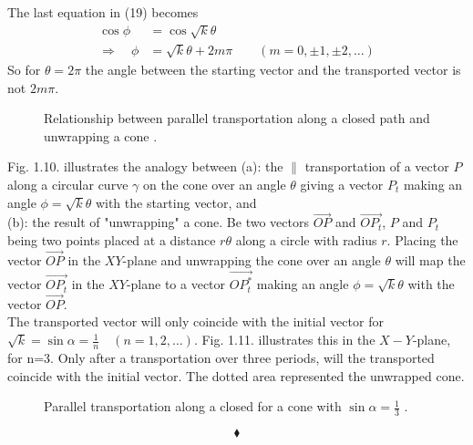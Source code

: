 The last equation in (19) becomes
\begin{align}
\cos{\phi} &= \cos{\sqrt{k}\theta} \\
\Rightarrow \quad \phi &= \sqrt{k}\theta + 2m\pi\quad\quad (m= 0,\pm 1,\pm 2, \dots)
\end{align}
So for $\theta = 2\pi$ the angle between the starting vector and the transported vector is not $2m\pi$. 
\begin{figure}[H]%
    \centering
    \subfloat[]{}
	\qquad
    \subfloat[]{}
\caption{Relationship between parallel transportation along a closed path and unwrapping a cone .}
\end{figure}
Fig. 1.10. illustrates the analogy between 
(a): the $\parallel$ transportation of a vector $P$ along a circular curve $\gamma$ on the cone over an angle $\theta$ giving a vector $P_t$ making an angle $\phi = \sqrt{k}\theta$ with the starting vector, and \\
(b): the result of "unwrapping" a cone. Be two vectors $\overrightarrow{OP}$ and $\overrightarrow{OP_t}$, $P$ and $P_t$ being two points placed at a distance $r\theta$ along a circle  with radius $r$. Placing the vector $\overrightarrow{OP}$ in the $XY$-plane and unwrapping the cone over an angle $\theta$ will map the vector $\overrightarrow{OP_t}$ in the $XY$-plane to a vector $\overrightarrow{OP_t^{*}}$ making an angle $\phi = \sqrt{k}\theta$ with the vector $\overrightarrow{OP}$.\\
The transported vector will only coincide with the initial vector for $\sqrt{k}=\sin{\alpha}  = \frac{1}{n}\quad (n= 1, 2, \dots)$. Fig. 1.11. illustrates this in the $X-Y$-plane,  for n=3. Only after a transportation over three periods, will the transported coincide with the initial vector. The dotted area represented the unwrapped cone.
\begin{figure}[H]%
    \centering
{}
\caption{Parallel transportation along a closed for a cone with $\sin{\alpha}  = \frac{1}{3}$ .}
\end{figure}
$$\blacklozenge$$
\newpage